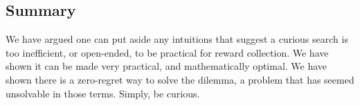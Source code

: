 

\subsection*{Summary}
We have argued one can put aside any intuitions that suggest a curious search is too inefficient, or open-ended, to be practical for reward collection. We have shown it can be made very practical, and mathematically optimal. We have shown there is a zero-regret way to solve the dilemma, a problem that has seemed unsolvable in those terms. Simply, be curious.
